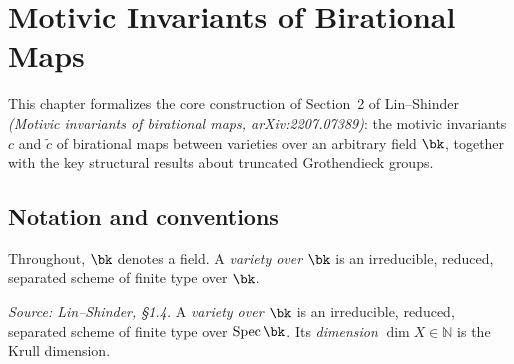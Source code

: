 \chapter{Motivic Invariants of Birational Maps}
\label{chap:overview}



This chapter formalizes the core construction of Section~2 of Lin--Shinder
\textit{(Motivic invariants of birational maps, arXiv:2207.07389)}: the motivic
invariants \(c\) and \(\tilde{c}\) of birational maps between varieties over an
arbitrary field \(\bk\), together with the key structural results about truncated
Grothendieck groups.

\section{Notation and conventions}


Throughout, \(\bk\) denotes a field.  A \emph{variety over \(\bk\)} is an
irreducible, reduced, separated scheme of finite type over \(\bk\).

\begin{definition}[Variety]
  \label{def:variety}
  \textit{Source: Lin--Shinder, §1.4.}
  A \emph{variety over \(\bk\)} is an irreducible, reduced, separated scheme of
  finite type over \(\operatorname{Spec}\bk\).  Its \emph{dimension}
  \(\dim X \in \mathbb{N}\) is the Krull dimension.
\end{definition}


